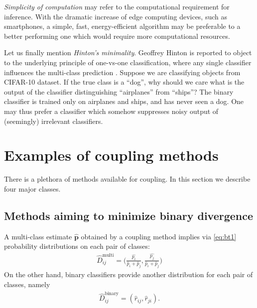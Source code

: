 \documentclass[twoside,11pt]{article}
\begin{document}
\emph{Simplicity of computation}  may refer to the computational requirement for inference. With the dramatic increase of edge computing devices, such as smartphones, a simple, fast, energy-efficient algorithm may be preferable to a better performing one which would require more computational resources. 

Let us finally mention \emph{Hinton's minimality}. Geoffrey Hinton is reported to object to the underlying principle of one-vs-one classification, where any single classifier influences the multi-class prediction \cite[p.~467]{hastie1998classification}. Suppose we are classifying objects from CIFAR-10 dataset.  If the true class is  a ``dog'', why should we care what is the output of the classifier distinguishing ``airplanes'' from ``ships''? The binary classifier is trained only on airplanes and ships, and has never seen a dog. One may thus prefer a classifier which somehow suppresses noisy output of (seemingly) irrelevant classifiers.




\section{Examples of coupling methods} \label{sec:coupling}

There is a plethora of methods available for coupling. In this section we describe four major classes.

\subsection{Methods aiming to minimize binary divergence}

A multi-class estimate $\hat{\boldsymbol{p}}$ obtained by a coupling method implies via \eqref{eq:bt1} probability distributions on each pair of classes:
\begin{align*}
	\hat D_{ij}^\textrm{multi}= \biggl(\frac{\hat{p_i}}{\hat p_i + \hat p_j},\frac{\hat{p_j}}{\hat p_i + \hat p_j}\biggr)	
\end{align*}
On the other hand, binary classifiers provide another distribution for each pair of  classes, namely
\begin{align*}
\hat D_{ij}^\textrm{binary} = (\hat r_{ij}, \hat r_{ji}).
\end{align*}
\end{document}
